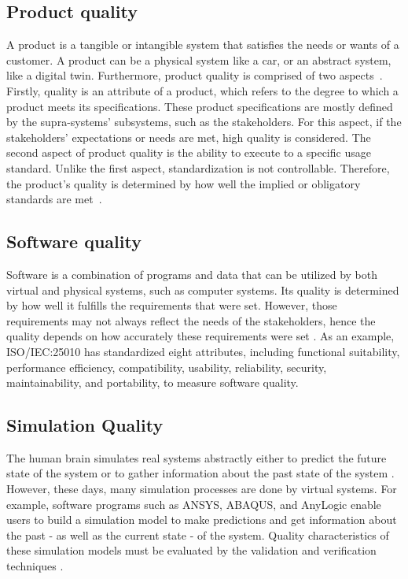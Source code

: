 \documentclass{llncs}
\begin{document}
    \subsection{Product quality}
    A product is a tangible or intangible system that satisfies the needs or wants of a customer. 
    A product can be a physical system like a car, or an abstract system, like a digital twin. Furthermore, product quality is comprised of two aspects~\cite{GrievesPLMBook}.  
    Firstly, quality is an attribute of a product, which refers to the degree to which a product meets its specifications. These product specifications are mostly defined by the supra-systems' subsystems, such as the stakeholders.
    For this aspect, if the stakeholders' expectations or needs are met,  high quality is considered. The second aspect of product quality is the ability to execute to a specific usage standard.
    Unlike the first aspect, standardization is not controllable. Therefore, the product's quality is determined by how well the implied or obligatory standards are met~\cite{GrievesPLMBook}.

    \subsection{Software quality}
    Software is a combination of programs and data that can be utilized by both virtual and physical systems, 
    such as computer systems\cite{OxfordDictionary}. Its quality is determined by how well it fulfills the requirements that were set. However, 
    those requirements may not always reflect the needs of the stakeholders, hence the quality depends on how accurately these requirements were set \cite{IEE730-2014}. 
    As an example, ISO/IEC:25010 has standardized eight attributes, 
    including functional suitability, performance efficiency, compatibility, usability, reliability, security, maintainability, and portability, to measure software quality.
    
    \subsection{Simulation Quality}
    The human brain simulates real systems abstractly either to predict the future state of the system or to gather information about the past state of the system 
    \cite{MobusSystemTheory}. However, these days, many simulation processes are done by virtual systems. For example,  software programs such as ANSYS\cite{Ansys}, ABAQUS\cite{Abaqus}, and AnyLogic\cite{AnyLogic} enable users 
    to build a simulation model to make predictions and get information about the past - as well as the current state - of the system.  
    Quality characteristics of these simulation models must be evaluated by the validation and verification techniques \cite{StewartSimulation} \cite{VerificationValidationSergent} \cite{OsmanBalci}. 
\end{document}
